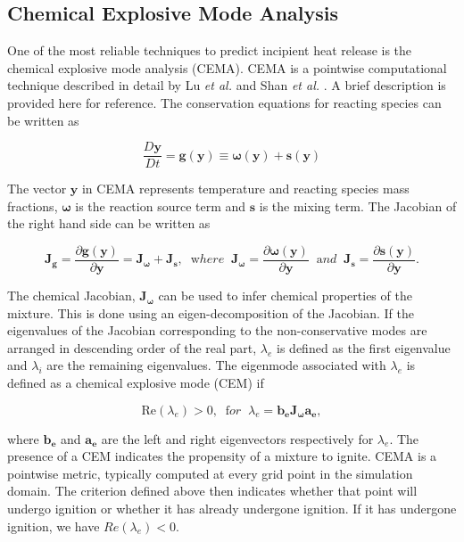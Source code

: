 \documentclass[final]{siamltex}
\begin{document}
\subsection{Chemical Explosive Mode Analysis}
\label{sec:intution}
One of the most reliable techniques to predict incipient heat release is
the chemical explosive mode analysis (CEMA).
CEMA is a pointwise computational technique described in detail by Lu \emph{et al.} \cite{lu} and Shan \emph{et al.}
\cite{shan}. A brief description is provided here for reference.
The conservation equations for reacting species can be written as 

\begin{equation*} 
\frac{D\mathbf{y}}{Dt} = \mathbf{g(y)} \equiv \mathbf{\omega(y)} + \mathbf{s(y)}
\end{equation*}

\noindent The vector $\mathbf{y}$ in CEMA represents temperature and reacting
species mass fractions, $\mathbf{\omega}$ is the reaction source term and
$\mathbf{s}$ is the mixing term. The Jacobian of the right hand side can be written as 

\[ 
\mathbf{J_g}  =  \frac{\partial \mathbf{g(y)}}{\partial \mathbf{y}} = \mathbf{J_\omega} + \mathbf{J_s}, \;\;{\mathrm where} \;\;
\mathbf{J_\omega} =  \frac{\partial \mathbf{\omega(y)}}{\partial \mathbf{y}}  \;\; {\mathrm and }\;\;
\mathbf{J_s}  =  \frac{\partial \mathbf{s(y)}}{\partial \mathbf{y}}. 
\]

\noindent The chemical Jacobian, $\mathbf{J_\omega}$ can be used to infer
chemical properties of the mixture. This is done using an
eigen-decomposition of the Jacobian. If the eigenvalues of the Jacobian
corresponding to the non-conservative modes are arranged in descending
order of the real part, $\lambda_e$ is defined as the first eigenvalue and
$\lambda_i$ are the remaining eigenvalues. The eigenmode associated with
$\lambda_e$ is defined as a chemical explosive mode (CEM) if 

\begin{equation}
\textrm{Re}(\lambda_e) > 0, \;\;{\mathrm for}\;\; \lambda_e = \mathbf{b_e J_\omega a_e},
\end{equation}   

\noindent where $\mathbf{b_e}$ and $\mathbf{a_e}$ are the left and right
eigenvectors respectively for $\lambda_e$. The presence of a CEM indicates
the propensity of a mixture to ignite. CEMA is a pointwise metric, typically
computed at every grid point in the simulation domain. The criterion
defined above then indicates whether that point will undergo ignition or
whether it has already undergone ignition. If it has undergone ignition, we
have $Re(\lambda_e)<0$.  
\end{document}
